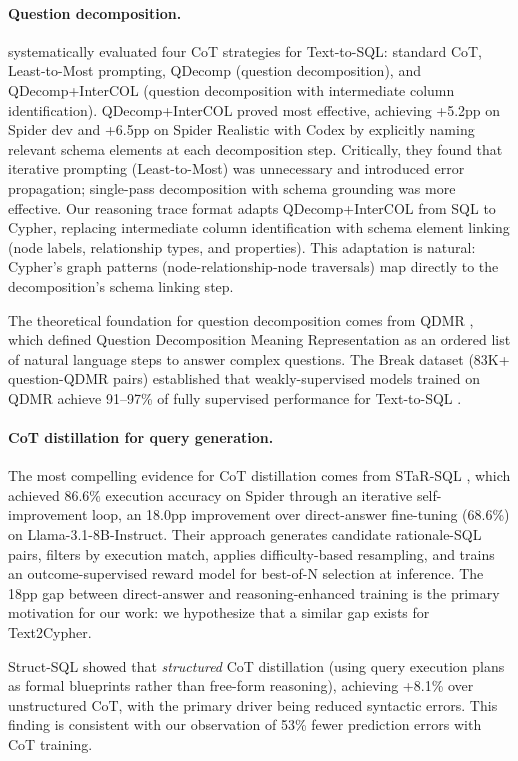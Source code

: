 \documentclass[11pt]{article}
\begin{document}
\paragraph{Question decomposition.} \citet{tai2023cot} systematically evaluated four CoT strategies for Text-to-SQL: standard CoT, Least-to-Most prompting, QDecomp (question decomposition), and QDecomp+InterCOL (question decomposition with intermediate column identification). QDecomp+InterCOL proved most effective, achieving +5.2pp on Spider dev and +6.5pp on Spider Realistic with Codex by explicitly naming relevant schema elements at each decomposition step. Critically, they found that iterative prompting (Least-to-Most) was unnecessary and introduced error propagation; single-pass decomposition with schema grounding was more effective. Our reasoning trace format adapts QDecomp+InterCOL from SQL to Cypher, replacing intermediate column identification with schema element linking (node labels, relationship types, and properties). This adaptation is natural: Cypher's graph patterns (node-relationship-node traversals) map directly to the decomposition's schema linking step.

The theoretical foundation for question decomposition comes from QDMR \citep{wolfson2020break}, which defined Question Decomposition Meaning Representation as an ordered list of natural language steps to answer complex questions. The Break dataset (83K+ question-QDMR pairs) established that weakly-supervised models trained on QDMR achieve 91--97\% of fully supervised performance for Text-to-SQL \citep{wolfson2022weakly}.

\paragraph{CoT distillation for query generation.} The most compelling evidence for CoT distillation comes from STaR-SQL \citep{he2025starsql}, which achieved 86.6\% execution accuracy on Spider through an iterative self-improvement loop, an 18.0pp improvement over direct-answer fine-tuning (68.6\%) on Llama-3.1-8B-Instruct. Their approach generates candidate rationale-SQL pairs, filters by execution match, applies difficulty-based resampling, and trains an outcome-supervised reward model for best-of-N selection at inference. The 18pp gap between direct-answer and reasoning-enhanced training is the primary motivation for our work: we hypothesize that a similar gap exists for Text2Cypher.

Struct-SQL \citep{thaker2025structsql} showed that \emph{structured} CoT distillation (using query execution plans as formal blueprints rather than free-form reasoning), achieving +8.1\% over unstructured CoT, with the primary driver being reduced syntactic errors. This finding is consistent with our observation of 53\% fewer prediction errors with CoT training.
\end{document}
